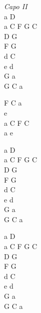 \begin{chordw}
    \textit{Capo II}\\
    a D\\
    a C F G C\\
    D G\\
    F G\\
    d C\\
    e d\\
    G a\\
    G C a

    F C a\\
    e\\
    a C F C\\
    a e

    a D\\
    a C F G C\\
    D G\\
    F G\\
    d C\\
    e d\\
    G a\\
    G C a

    a D\\
    a C F G C\\
    D G\\
    F G\\
    d C\\
    e d\\
    G a\\
    G C a
\end{chordw}